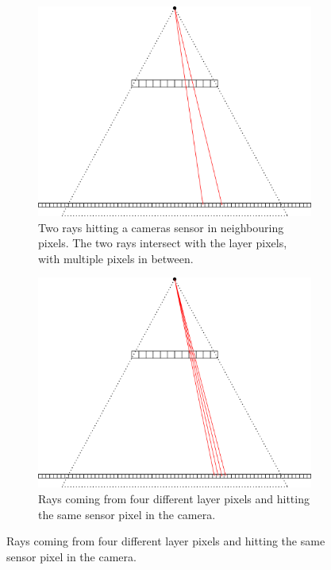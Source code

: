 \documentclass[11pt,a4paper,titlepage]{article}
\begin{document}
\begin{figure}[h]
	\centering
	\begin{subfigure}[t]{0.4\textwidth}
 		\includegraphics[scale=0.3]{sketches/problem_camera_to_layers.png} 
		\caption{Two rays hitting a cameras sensor in neighbouring pixels. The two rays intersect with the layer pixels, with multiple pixels in between.}
		\label{fig:problem_camera_to_layers}
	\end{subfigure}%
	\qquad
	\begin{subfigure}[t]{0.4\textwidth}
		\includegraphics[scale=0.3]{sketches/problem_layers_to_camera_rounding.png}
		\caption{Rays coming from four different layer pixels and hitting the same sensor pixel in the camera.}
		\label{fig:problem_layers_to_camera}
	\end{subfigure}
\end{figure}
\end{document}
